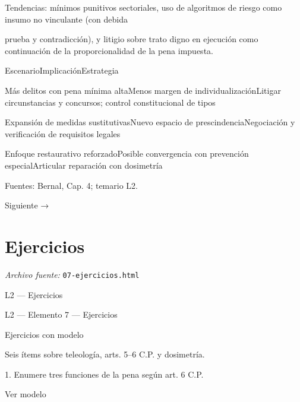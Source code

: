 \documentclass[11pt,a4paper]{article}
\begin{document}
      Tendencias: mínimos punitivos sectoriales, uso de algoritmos de riesgo como insumo no vinculante (con debida\par
      prueba y contradicción), y litigio sobre trato digno en ejecución como continuación de la proporcionalidad de la pena impuesta.\par





          EscenarioImplicaciónEstrategia\par




          Más delitos con pena mínima altaMenos margen de individualizaciónLitigar circunstancias y concursos; control constitucional de tipos\par

          Expansión de medidas sustitutivasNuevo espacio de prescindenciaNegociación y verificación de requisitos legales\par

          Enfoque restaurativo reforzadoPosible convergencia con prevención especialArticular reparación con dosimetría\par








      Fuentes: Bernal, Cap. 4; temario L2.\par


    Siguiente →\par

\section{Ejercicios}
\noindent\textit{Archivo fuente:} \texttt{07-ejercicios.html}

L2 — Ejercicios\par





    L2 — Elemento 7 — Ejercicios\par
    Ejercicios con modelo\par

    Seis ítems sobre teleología, arts. 5–6 C.P. y dosimetría.\par


      1. Enumere tres funciones de la pena según art. 6 C.P.\par

      Ver modelo\par
\end{document}
